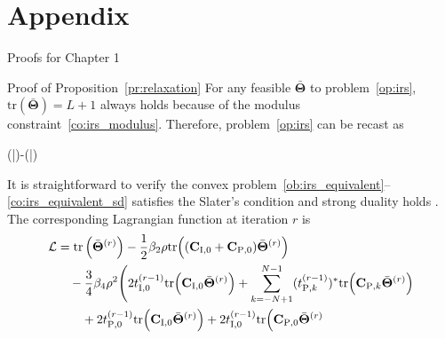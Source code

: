 \chapter{Appendix}


\begin{section}{Proofs for Chapter 1}
	\begin{subsection}{Proof of Proposition~\ref{pr:relaxation}}\label{ap:relaxation}
		For any feasible $\bar{\mathbf{\Theta}}$ to problem~\eqref{op:irs}, $\mathrm{tr}(\bar{\mathbf{\Theta}})=L+1$ always holds because of the modulus constraint~\eqref{co:irs_modulus}.
		Therefore, problem~\eqref{op:irs} can be recast as
		\begin{maxi!}
			{\scriptstyle{\bar{\mathbf{\Theta}}}}{(\bar{\mathbf{\Theta}})-(\bar{\mathbf{\Theta}})}{\label{op:irs_equivalent}}{\label{ob:irs_equivalent}}
			\label{co:irs_equivalent_rate}
			\label{co:irs_equivalent_modulus}
			\label{co:irs_equivalent_sd}
		\end{maxi!}
		It is straightforward to verify the convex problem~\eqref{ob:irs_equivalent}--\eqref{co:irs_equivalent_sd} satisfies the Slater's condition and strong duality holds \cite{Boyd2004}.
		The corresponding Lagrangian function at iteration $r$ is
		\begin{equation}\label{eq:lagrangian}
			\begin{split}
				\mathcal{L}
				& = \mathrm{tr}\left(\bar{\mathbf{\Theta}}^{(r)}\right) - \frac{1}{2} \beta_2 \rho \mathrm{tr}\Bigl(
						(\mathbf{C}_{\mathrm{I},0} + \mathbf{C}_{\mathrm{P},0}) \bar{\mathbf{\Theta}}^{(r)}
					\Bigr) \\
				& \quad - \frac{3}{4} \beta_4 \rho^2 \Biggl(
						2 t_{\mathrm{I},0}^{(r-1)} \mathrm{tr}\Bigl(
							\mathbf{C}_{\mathrm{I},0} \bar{\mathbf{\Theta}}^{(r)}
						\Bigr) + \sum_{k=-N+1}^{N-1} (t_{\mathrm{P},k}^{(r-1)})^* \mathrm{tr}\Bigl(
							\mathbf{C}_{\mathrm{P},k} \bar{\mathbf{\Theta}}^{(r)}
						\Bigr)\\
				& \qquad + 2 t_{\mathrm{P},0}^{(r-1)} \mathrm{tr}\Bigl(
						\mathbf{C}_{\mathrm{I},0} \bar{\mathbf{\Theta}}^{(r)}
					\Bigr) + 2 t_{\mathrm{I},0}^{(r-1)} \mathrm{tr}\Bigl(
						\mathbf{C}_{\mathrm{P},0} \bar{\mathbf{\Theta}}^{(r)}

\end{split}
\end{equation}
\end{subsection}
\end{section}
